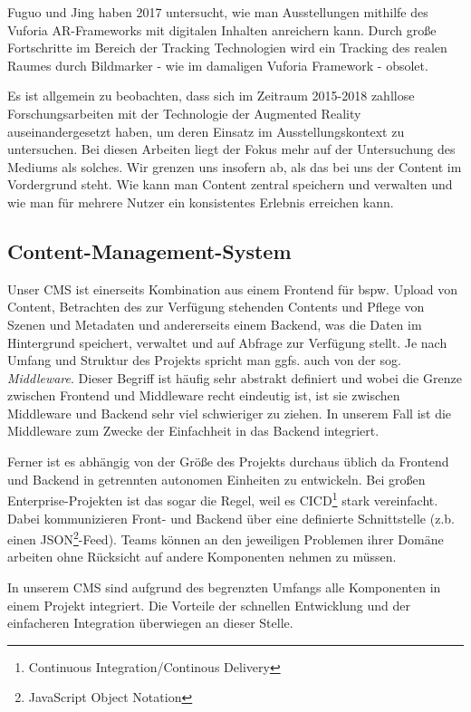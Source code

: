 \documentclass[titlepage, a4paper, 11pt]{scrartcl}
\begin{document}
      Fuguo und Jing haben 2017 untersucht, wie man Ausstellungen mithilfe des Vuforia AR-Frameworks mit digitalen Inhalten anreichern kann\cite{peng2017mobile}. Durch große Fortschritte
      im Bereich der Tracking Technologien wird ein Tracking des realen Raumes durch Bildmarker - wie im damaligen Vuforia Framework - obsolet.

      Es ist allgemein zu beobachten, dass sich im Zeitraum 2015-2018 zahllose Forschungsarbeiten mit der Technologie der Augmented Reality auseinandergesetzt haben,
      um deren Einsatz im Ausstellungskontext zu untersuchen. Bei diesen Arbeiten liegt der Fokus mehr auf der Untersuchung des Mediums als solches. Wir grenzen uns insofern ab,
      als das bei uns der Content im Vordergrund steht. Wie kann man Content zentral speichern und verwalten und wie man für mehrere Nutzer ein konsistentes Erlebnis 
      erreichen kann.

      \pagebreak

    \subsection{Content-Management-System}

      Unser CMS ist einerseits Kombination aus einem Frontend für bspw. Upload von Content, Betrachten des zur Verfügung stehenden Contents und Pflege von Szenen und Metadaten 
      und andererseits einem Backend, was die Daten im Hintergrund speichert, verwaltet und auf Abfrage zur Verfügung stellt. Je nach Umfang und Struktur des Projekts spricht man ggfs. auch 
      von der sog. \textit{Middleware}. Dieser Begriff ist häufig sehr abstrakt definiert und wobei die Grenze zwischen Frontend und Middleware recht eindeutig ist,
      ist sie zwischen Middleware und Backend sehr viel schwieriger zu ziehen. In unserem Fall ist die Middleware zum Zwecke der Einfachheit in das Backend integriert.

      Ferner ist es abhängig von der Größe des Projekts durchaus üblich da Frontend und Backend in getrennten autonomen Einheiten zu entwickeln. 
      Bei großen Enterprise-Projekten ist das sogar die Regel, weil es CICD\footnote{Continuous Integration/Continous Delivery} stark vereinfacht.
      Dabei kommunizieren Front- und Backend über eine definierte Schnittstelle (z.b. einen JSON\footnote{JavaScript Object Notation}-Feed).
      Teams können an den jeweiligen Problemen ihrer Domäne arbeiten ohne Rücksicht auf andere Komponenten nehmen zu müssen.

      In unserem CMS sind aufgrund des begrenzten Umfangs alle Komponenten in einem Projekt integriert. 
      Die Vorteile der schnellen Entwicklung und der einfacheren Integration überwiegen an dieser Stelle.
\end{document}
